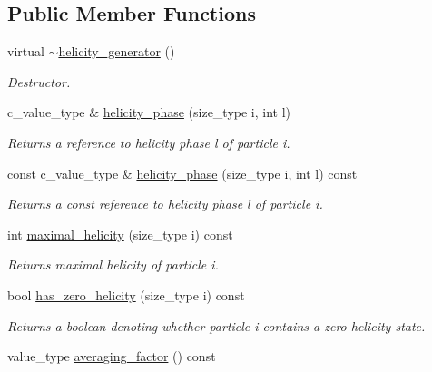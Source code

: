 \subsection*{Public Member Functions}
\begin{DoxyCompactItemize}
\item 
\hypertarget{a00268_a10babb70a60f6671b35bdb45227aefad}{virtual \hyperlink{a00268_a10babb70a60f6671b35bdb45227aefad}{$\sim$helicity\-\_\-generator} ()}\label{a00268_a10babb70a60f6671b35bdb45227aefad}

\begin{DoxyCompactList}\small\item\em Destructor. \end{DoxyCompactList}\item 
\hypertarget{a00268_a91e8d2238fd375fea57d6c344a4fcafc}{c\-\_\-value\-\_\-type \& \hyperlink{a00268_a91e8d2238fd375fea57d6c344a4fcafc}{helicity\-\_\-phase} (size\-\_\-type i, int l)}\label{a00268_a91e8d2238fd375fea57d6c344a4fcafc}

\begin{DoxyCompactList}\small\item\em Returns a reference to helicity phase l of particle i. \end{DoxyCompactList}\item 
\hypertarget{a00268_a30fcb04c2016208a6e792829c8d5a364}{const c\-\_\-value\-\_\-type \& \hyperlink{a00268_a30fcb04c2016208a6e792829c8d5a364}{helicity\-\_\-phase} (size\-\_\-type i, int l) const }\label{a00268_a30fcb04c2016208a6e792829c8d5a364}

\begin{DoxyCompactList}\small\item\em Returns a const reference to helicity phase l of particle i. \end{DoxyCompactList}\item 
\hypertarget{a00268_a4098dd33ce8705cb67aaa16aa03fb657}{int \hyperlink{a00268_a4098dd33ce8705cb67aaa16aa03fb657}{maximal\-\_\-helicity} (size\-\_\-type i) const }\label{a00268_a4098dd33ce8705cb67aaa16aa03fb657}

\begin{DoxyCompactList}\small\item\em Returns maximal helicity of particle i. \end{DoxyCompactList}\item 
bool \hyperlink{a00268_a23ecd31466020f4c1afa401ac5778e60}{has\-\_\-zero\-\_\-helicity} (size\-\_\-type i) const 
\begin{DoxyCompactList}\small\item\em Returns a boolean denoting whether particle i contains a zero helicity state. \end{DoxyCompactList}\item 
\hypertarget{a00268_ac1f1ede008b6bc97ae556204636c3506}{value\-\_\-type \hyperlink{a00268_ac1f1ede008b6bc97ae556204636c3506}{averaging\-\_\-factor} () const }\label{a00268_ac1f1ede008b6bc97ae556204636c3506}


\end{DoxyCompactItemize}

